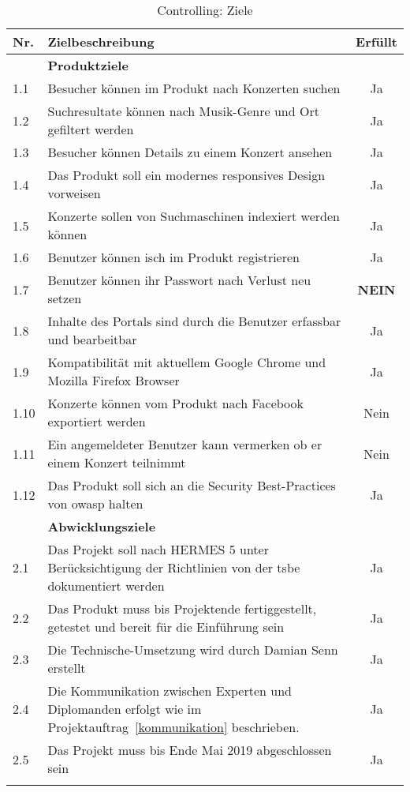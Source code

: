 \begin{longtable}[]{@{}lp{10.5cm}c@{}}
  \toprule
  Nr.  & Zielbeschreibung                                                                                                   & Erfüllt\tabularnewline
  \toprule
  \endhead
       & \textbf{Produktziele}\tabularnewline
  \midrule
  1.1  & Besucher können im Produkt nach Konzerten suchen                                                                   & Ja\tabularnewline
  1.2  & Suchresultate können nach Musik-Genre und Ort gefiltert werden                                                     & Ja\tabularnewline
  1.3  & Besucher können Details zu einem Konzert ansehen                                                                   & Ja\tabularnewline
  1.4  & Das Produkt soll ein modernes responsives Design vorweisen                                                         & Ja\tabularnewline
  1.5  & Konzerte sollen von Suchmaschinen indexiert werden können                                                          & Ja\tabularnewline
  1.6  & Benutzer können isch im Produkt registrieren                                                                       & Ja\tabularnewline
  1.7  & Benutzer können ihr Passwort nach Verlust neu setzen                                                               & \textbf{NEIN}\tabularnewline
  1.8  & Inhalte des Portals sind durch die Benutzer erfassbar und bearbeitbar                                              & Ja\tabularnewline
  1.9  & Kompatibilität mit aktuellem Google Chrome und Mozilla Firefox Browser                                             & Ja\tabularnewline
  1.10 & Konzerte können vom Produkt nach Facebook exportiert werden                                                        & Nein\tabularnewline
  1.11 & Ein angemeldeter Benutzer kann vermerken ob er einem Konzert teilnimmt                                             & Nein\tabularnewline
  1.12 & Das Produkt soll sich an die Security Best-Practices von \Gls{owasp} halten                                        & Ja\tabularnewline
  \toprule
       & \textbf{Abwicklungsziele}\tabularnewline
  \midrule
  2.1  & Das Projekt soll nach HERMES 5 unter Berücksichtigung der Richtlinien von der \Gls{tsbe} dokumentiert werden       & Ja\tabularnewline
  2.2  & Das Produkt muss bis Projektende fertiggestellt, getestet und bereit für die Einführung sein                       & Ja\tabularnewline
  2.3  & Die Technische-Umsetzung wird durch Damian Senn erstellt                                                           & Ja\tabularnewline
  2.4  & Die Kommunikation zwischen Experten und Diplomanden erfolgt wie im Projektauftrag~\ref{kommunikation} beschrieben. & Ja\tabularnewline
  2.5  & Das Projekt muss bis Ende Mai 2019 abgeschlossen sein                                                              & Ja\tabularnewline
  \bottomrule
  \caption{Controlling: Ziele}
\end{longtable}

